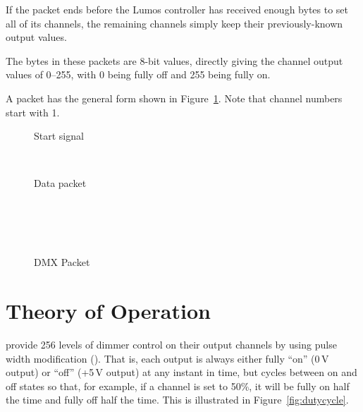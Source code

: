 \documentclass[letterpaper,twoside,onecolumn,openright,final]{memoir}
\begin{document}
\begin{NotImplemented*}
If the packet ends before the Lumos controller has received enough bytes to set all of its channels,
the remaining channels simply keep their previously-known output values.

The bytes in these packets are 8-bit values, directly giving the channel output values of 0--255, with 0
being fully off and 255 being fully on.

A packet has the general form shown in Figure~\ref{fig:dmx}. Note that  
channel numbers start with 1.
\begin{figure}
 \begin{BF}
  \begin{rightwordgroup}{Start signal}
  \\
  \end{rightwordgroup}\\
  \begin{rightwordgroup}{Data packet}
  \\
  \\
  \\
  \\
   \\
  \end{rightwordgroup}
 \end{BF}
 \caption{DMX Packet\label{fig:dmx}}
\end{figure}
\end{NotImplemented*}
\chapter{Theory of Operation}\label{ch:too}
 provide 256 levels of dimmer control on their
output channels by using pulse width modification ().  That is, each output
is always either fully ``on'' (0\,V output) or ``off'' (+5\,V output) at any instant in
time, but cycles between on and off states so that, for example, if a channel is set
to 50\%, it will be fully on half the time and fully off half the time.  This is
illustrated in Figure~\ref{fig:dutycycle}.

\end{document}
